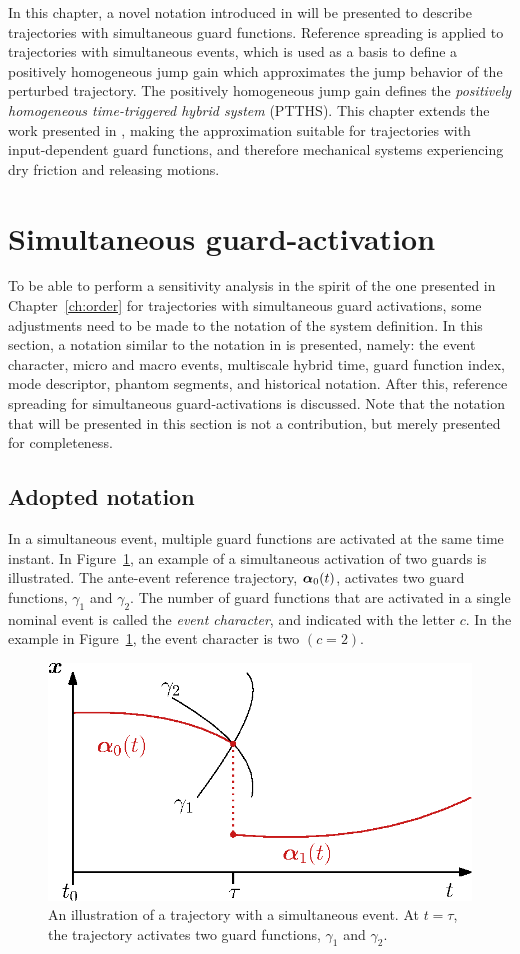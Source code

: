 \documentclass[../DC2019003Bouma.tex]{subfiles}
\begin{document}
In this chapter, a novel notation introduced in \cite{Rijnen2018} will be presented to describe trajectories with simultaneous guard functions. Reference spreading is applied to trajectories with simultaneous events, which is used as a basis to define a positively homogeneous jump gain which approximates the jump behavior of the perturbed trajectory. The positively homogeneous jump gain defines the \textit{positively homogeneous time-triggered hybrid system} (PTTHS). This chapter extends the work presented in \cite{Rijnen2018,Rijnen2018a}, making the approximation suitable for trajectories with input-dependent guard functions, and therefore mechanical systems experiencing dry friction and releasing motions.

\section{Simultaneous guard-activation}\label{sec:simguards}
To be able to perform a sensitivity analysis in the spirit of the one presented in Chapter~\ref{ch:order} for trajectories with simultaneous guard activations, some adjustments need to be made to the notation of the system definition. In this section, a notation similar to the notation in \cite{Rijnen2018} is presented, namely: the event character, micro and macro events, multiscale hybrid time, guard function index, mode descriptor, phantom segments, and historical notation. After this, reference spreading for simultaneous guard-activations is discussed. Note that the notation that will be presented in this section is not a contribution, but merely presented for completeness.

\subsection{Adopted notation}\label{sec:4not}
In a simultaneous event, multiple guard functions are activated at the same time instant. In Figure~\ref{fig:4simulexample}, an example of a simultaneous activation of two guards is illustrated. The ante-event reference trajectory, $\boldsymbol{\alpha}_0(t)$, activates two guard functions, $\gamma_1$ and $\gamma_2$. The number of guard functions that are activated in a single nominal event is called the \textit{event character}, and indicated with the letter $c$. In the example in Figure~\ref{fig:4simulexample}, the event character is two $(c = 2)$.

\begin{figure}[bt!]
\centering
\includegraphics[width=.45\textwidth]{simulexample.eps}\caption{An illustration of a trajectory with a simultaneous event. At $t=\tau$, the trajectory activates two guard functions, $\gamma_1$ and $\gamma_2$.} \label{fig:4simulexample}
\end{figure}
\end{document}
